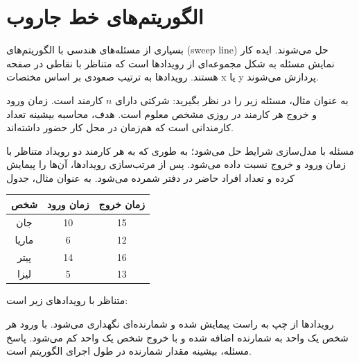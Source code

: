 \chapter{الگوریتم‌های خط جاروب}


بسیاری از مسئله‌های هندسی با الگوریتم‌های  (sweep line) حل می‌شوند.
ایده کار نمایش مسئله به شکل مجموعه‌ای از رویدادها است که متناظر با نقاطی در صفحه هستند.
رویدادها به ترتیب صعودی بر اساس مختصات x یا y پردازش می‌شوند.

به عنوان مثال، مسئله زیر را در نظر بگیرید:
شرکتی دارای $n$ کارمند است.
زمان ورود و خروج هر کارمند در روزی مشخص معلوم است.
هدف، محاسبه بیشینه تعداد کارمندانی است که هم‌زمان در محل کار حضور داشته‌اند.

مسئله با مدل‌سازی شرایط حل می‌شود؛ به طوری که به هر کارمند دو رویداد متناظر با زمان ورود و خروج نسبت داده می‌شود.
پس از مرتب‌سازی رویدادها، آن‌ها را پیمایش کرده و تعداد افراد حاضر در دفتر شمرده می‌شود.
به عنوان مثال، جدول
\begin{center}
\begin{tabular}{ccc}
شخص & زمان ورود & زمان خروج \\
\hline
جان & 10 & 15 \\
ماریا & 6 & 12 \\
پیتر & 14 & 16 \\
لیزا & 5 & 13 \\
\end{tabular}
\end{center}
متناظر با رویدادهای زیر است:
\begin{center}
\end{center}
رویدادها از چپ به راست پیمایش شده و شمارنده‌ای نگهداری می‌شود.
با ورود هر شخص یک واحد به شمارنده اضافه شده و با خروج شخص یک واحد کم می‌شود.
پاسخ مسئله، بیشینه مقدار شمارنده در طول اجرای الگوریتم است.

